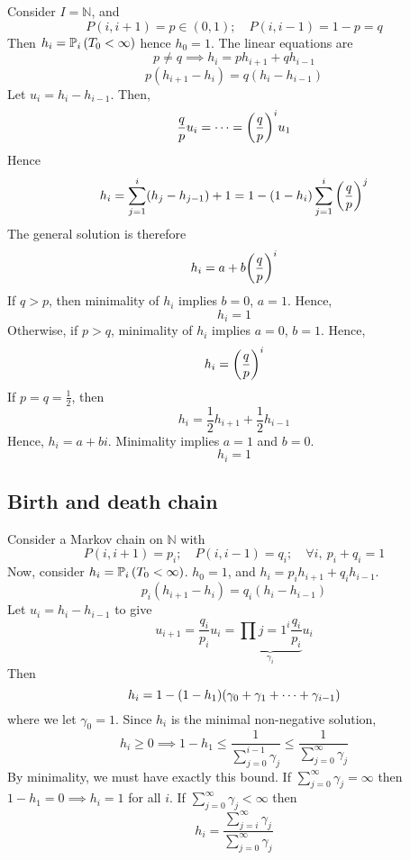 \begin{example}
	Consider \( I = \mathbb N \), and
	\[
		P(i, i+1) = p \in (0,1);\quad P(i, i-1) = 1-p = q
	\]
	Then \( h_i = \mathbb{P}_{i}\left({T_0 < \infty}\right) \) hence \( h_0 = 1 \).
	The linear equations are
	\[
		p \neq q \implies h_i = p h_{i+1} + q h_{i-1}
	\]
	\[
		p(h_{i+1} - h_i) = q(h_i - h_{i-1})
	\]
	Let \( u_i = h_i - h_{i-1} \).
	Then,
	\[
		\frac{q}{p} u_i = \dots = \qty(\frac{q}{p})^i u_1
	\]
	Hence
	\[
		h_i = \sum_{j=1}^i (h_j - h_{j-1}) + 1 = 1 - (1-h_i) \sum_{j=1}^i \qty(\frac{q}{p})^j
	\]
	The general solution is therefore
	\[
		h_i = a + b \qty(\frac{q}{p})^i
	\]
	If \( q > p \), then minimality of \( h_i \) implies \( b = 0 \), \( a = 1 \).
	Hence,
	\[
		h_i = 1
	\]
	Otherwise, if \( p > q \), minimality of \( h_i \) implies \( a = 0 \), \( b = 1 \).
	Hence,
	\[
		h_i = \qty(\frac{q}{p})^i
	\]
	If \( p = q = \frac{1}{2} \), then
	\[
		h_i = \frac{1}{2} h_{i+1} + \frac{1}{2} h_{i-1}
	\]
	Hence, \( h_i = a + bi \).
	Minimality implies \( a = 1 \) and \( b = 0 \).
	\[
		h_i = 1
	\]
\end{example}

\subsection{Birth and death chain}
Consider a Markov chain on \( \mathbb N \) with
\[
	P(i,i+1) = p_i;\quad P(i,i-1) = q_i;\quad \forall i,\ p_i + q_i = 1
\]
Now, consider \( h_i = \mathbb{P}_{i}\left({T_0 < \infty}\right) \).
\( h_0 = 1 \), and \( h_i = p_i h_{i+1} + q_i h_{i-1} \).
\[
	p_i (h_{i+1} - h_i) = q_i (h_i - h_{i-1})
\]
Let \( u_i = h_i - h_{i-1} \) to give
\[
	u_{i+1} = \frac{q_i}{p_i} u_i = \underbrace{\prod{j=1}^i \frac{q_i}{p_i}}_{\gamma_i} u_i
\]
Then
\[
	h_i = 1 - (1 - h_1) \qty( \gamma_0 + \gamma_1 + \dots + \gamma_{i-1} )
\]
where we let \( \gamma_0 = 1 \).
Since \( h_i \) is the minimal non-negative solution,
\[
	h_i \geq 0 \implies 1 - h_1 \leq \frac{1}{\sum_{j=0}^{i-1} \gamma_j} \leq \frac{1}{\sum_{j=0}^{\infty} \gamma_j}
\]
By minimality, we must have exactly this bound.
If \( \sum_{j=0}^\infty \gamma_j = \infty \) then \( 1 - h_1 = 0 \implies h_i = 1 \) for all \( i \).
If \( \sum_{j=0}^\infty \gamma_j < \infty \) then
\[
	h_i = \frac{\sum_{j=i}^\infty \gamma_j}{\sum_{j=0}^\infty \gamma_j}
\]

